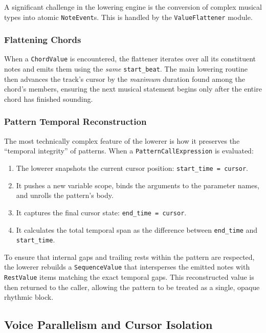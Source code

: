 A significant challenge in the lowering engine is the conversion of complex musical types into atomic
\texttt{NoteEvent}s.
This is handled by the \texttt{ValueFlattener} module.

\subsubsection{Flattening Chords}
When a \texttt{ChordValue} is encountered, the flattener iterates over all its constituent notes and emits them using
the \textit{same} \texttt{start\_beat}.
The main lowering routine then advances the track's cursor by the \textit{maximum} duration found among the chord's
members, ensuring the next musical statement begins only after the entire chord has finished sounding.

\subsubsection{Pattern Temporal Reconstruction}
The most technically complex feature of the lowerer is how it preserves the ``temporal integrity'' of patterns.
When a \texttt{PatternCallExpression} is evaluated:
\begin{enumerate}
  \item The lowerer snapshots the current cursor position: \texttt{start\_time = cursor}.
  \item It pushes a new variable scope, binds the arguments to the parameter names, and unrolls the pattern's body.
  \item It captures the final cursor state: \texttt{end\_time = cursor}.
  \item It calculates the total temporal span as the difference between \texttt{end\_time} and \texttt{start\_time}.
\end{enumerate}

To ensure that internal gaps and trailing rests within the pattern are respected, the lowerer rebuilds a
\texttt{SequenceValue} that intersperses the emitted notes with \texttt{RestValue} items matching the exact temporal
gaps.
This reconstructed value is then returned to the caller, allowing the pattern to be treated as a single, opaque rhythmic
block.

\subsection{Voice Parallelism and Cursor Isolation}\label{subsec:voice-parallelism-and-cursor-isolation}

